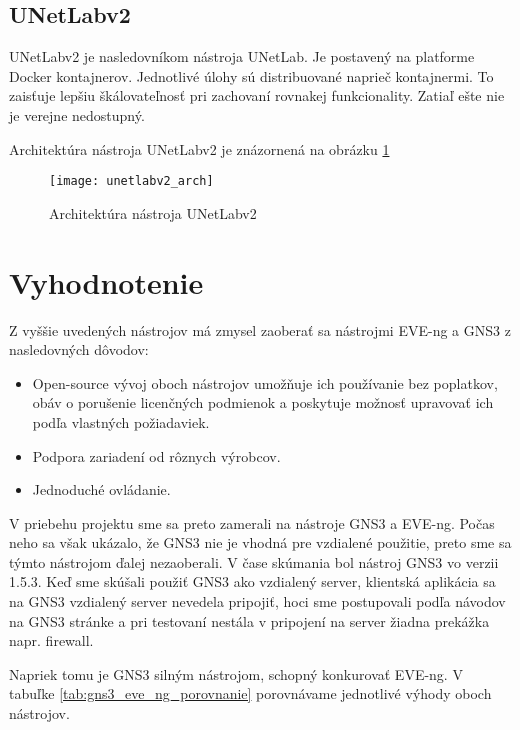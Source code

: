 \subsection{UNetLabv2}

UNetLabv2 je nasledovníkom nástroja UNetLab. Je postavený na platforme Docker kontajnerov. Jednotlivé úlohy sú distribuované naprieč kontajnermi. To zaisťuje lepšiu škálovateľnosť pri zachovaní rovnakej funkcionality. Zatiaľ ešte nie je verejne nedostupný.

Architektúra nástroja UNetLabv2 je znázornená na obrázku \ref{obr:unetlabv2_arch}

\begin{figure}
    \centering
    \texttt{[image: unetlabv2\_arch]}
    \caption{Architektúra nástroja UNetLabv2} \cite{obr_unetlabv2_arch}
    \label{obr:unetlabv2_arch}
\end{figure}

\section{Vyhodnotenie}

Z vyššie uvedených nástrojov má zmysel zaoberať sa nástrojmi EVE-ng a GNS3 z nasledovných dôvodov:
\begin{itemize}[noitemsep]
    \item Open-source vývoj oboch nástrojov umožňuje ich používanie bez poplatkov, obáv o porušenie licenčných podmienok a poskytuje možnosť upravovať ich podľa vlastných požiadaviek.
    \item Podpora zariadení od rôznych výrobcov.
    \item Jednoduché ovládanie.
\end{itemize}

V priebehu projektu sme sa preto zamerali na nástroje GNS3 a EVE-ng. Počas neho sa však ukázalo, že GNS3 nie je vhodná pre vzdialené použitie, preto sme sa týmto nástrojom ďalej nezaoberali. V čase skúmania bol nástroj GNS3 vo verzii 1.5.3. Keď sme skúšali použiť GNS3 ako vzdialený server, klientská aplikácia sa na GNS3 vzdialený server nevedela pripojiť, hoci sme postupovali podľa návodov na GNS3 stránke a pri testovaní nestála v pripojení na server žiadna prekážka napr. firewall.

Napriek tomu je GNS3 silným nástrojom, schopný konkurovať EVE-ng. V tabuľke \ref{tab:gns3_eve_ng_porovnanie} porovnávame jednotlivé výhody oboch nástrojov.

